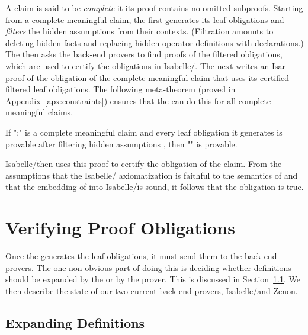 \documentclass[a4paper]{easychair}
\begin{document}
A claim is said to be \emph{complete} it its proof contains no omitted
subproofs. Starting from a complete meaningful claim, the \PM first
generates its leaf obligations and \textit{filters} the hidden
assumptions from their contexts. (Filtration amounts to deleting
hidden facts and replacing hidden operator definitions with
declarations.) The \PM then asks the back-end provers to find proofs
of the filtered obligations, which are used to certify the obligations
in Isabelle/\tlaplus.
The \PM next writes an Isar proof of the obligation of the complete
meaningful claim that uses its certified filtered leaf
obligations. The following meta-theorem (proved in
Appendix~\ref{apx:constraints}) ensures that the \PM can do this for
all complete meaningful claims.
\begin{thm} \label{thm:meaning}
If "\pi:" is a complete meaningful claim and every
  leaf obligation it generates is provable after filtering hidden
  assumptions , then "" is provable.
\end{thm}

\noindent Isabelle/\tlaplus then uses this proof to certify the obligation of
the claim. From the assumptions that the Isabelle/\tlaplus
axiomatization is faithful to the semantics of \tlatwo and that the
embedding of \tlatwo into Isabelle/\tlaplus is sound, it follows that
the obligation is true.

\section{Verifying Proof Obligations}
\label{sec:backend}

Once the \PM generates the leaf obligations, it must send them to the
back-end provers.  The one non-obvious part of doing this is deciding
whether definitions should be expanded by the \PM or by the prover.
This is discussed in Section~\ref{sec:backend.pm}.  We then describe
the state of our two current back-end provers, Isabelle/\tlaplus and
Zenon.

\subsection{Expanding Definitions}
\label{sec:backend.pm}
\end{document}
